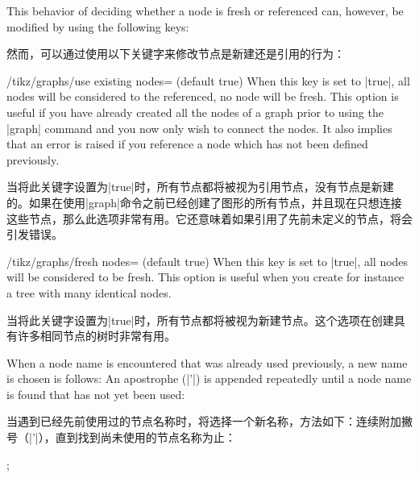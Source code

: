 This behavior of deciding whether a node is fresh or referenced can, however,
be modified by using the following keys:

然而，可以通过使用以下关键字来修改节点是新建还是引用的行为：

%
\begin{key}{/tikz/graphs/use existing nodes= (default true)}
    When this key is set to |true|, all nodes will be considered to the
    referenced, no node will be fresh. This option is useful if you have
    already created all the nodes of a graph prior to using the |graph| command
    and you now only wish to connect the nodes. It also implies that an error
    is raised if you reference a node which has not been defined previously.

    当将此关键字设置为|true|时，所有节点都将被视为引用节点，没有节点是新建的。如果在使用|graph|命令之前已经创建了图形的所有节点，并且现在只想连接这些节点，那么此选项非常有用。它还意味着如果引用了先前未定义的节点，将会引发错误。

  \end{key}

\begin{key}{/tikz/graphs/fresh nodes= (default true)}
    When this key is set to |true|, all nodes will be considered to be fresh.
    This option is useful when you create for instance a tree with many
    identical nodes.

当将此关键字设置为|true|时，所有节点都将被视为新建节点。这个选项在创建具有许多相同节点的树时非常有用。


    When a node name is encountered that was already used previously, a new
    name is chosen is follows: An apostrophe (|'|) is appended repeatedly until
    a node name is found that has not yet been used:

    当遇到已经先前使用过的节点名称时，将选择一个新名称，方法如下：连续附加撇号（|'|），直到找到尚未使用的节点名称为止：
\begin{codeexample}[preamble={\usetikzlibrary{graphs}}]
\tikz {};
\end{codeexample}
\end{key}

